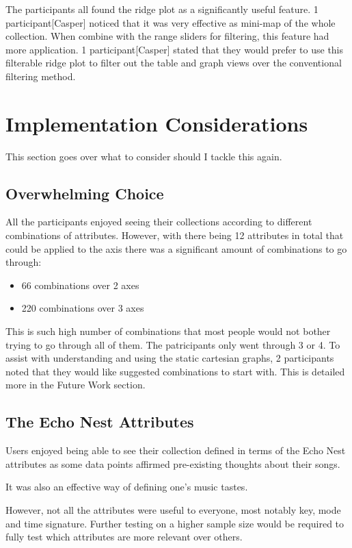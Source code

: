 The participants all found the ridge plot as a significantly useful feature. 1 participant[Casper] noticed that it was very effective as mini-map of the whole collection. When combine with the range sliders for filtering, this feature had more application. 1 participant[Casper] stated that they would prefer to use this filterable ridge plot to filter out the table and graph views over the conventional filtering method.

\section{Implementation Considerations}
This section goes over what to consider should I tackle this again.

\subsection{Overwhelming Choice}
All the participants enjoyed seeing their collections according to different combinations of attributes. However, with there being 12 attributes in total that could be applied to the axis there was a significant amount of combinations to go through:\begin{itemize}
    \item 66 combinations over 2 axes
    \item 220 combinations over 3 axes
\end{itemize}
This is such high number of combinations that most people would not bother trying to go through all of them. The patricipants only went through 3 or 4. To assist with understanding and using the static cartesian graphs, 2 participants noted that they would like suggested combinations to start with. This is detailed more in the Future Work section.

\subsection{The Echo Nest Attributes}%
Users enjoyed being able to see their collection defined in terms of the Echo Nest attributes as some data points affirmed pre-existing thoughts about their songs.

It was also an effective way of defining one's music tastes.

However, not all the attributes were useful to everyone, most notably key, mode and time signature. Further testing on a higher sample size would be required to fully test which attributes are more relevant over others.

